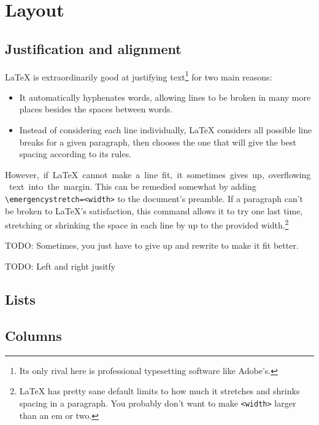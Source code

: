 \chapter{Layout}

\section{Justification and alignment}

\LaTeX{} is extraordinarily good at justifying text\footnote{Its
only rival here is professional typesetting software like Adobe's.}
for two main reasons:
\begin{itemize}
\item It automatically hyphenates words, allowing lines to be broken
    in many more places besides the spaces between
    words.\punckern{}

\item Instead of considering each line individually,
    \LaTeX{} considers all possible line breaks for a given paragraph,
    then chooses the one that will give the best spacing according to its
    rules.\punckern{}
\end{itemize}

\mbox{However, if \LaTeX{} cannot make a line fit, it sometimes gives up,
overflowing text into the margin.}
This can be remedied somewhat by adding
\verb|\emergencystretch=<width>| to the document's preamble.
If a paragraph can't be broken to \LaTeX's satisfaction,
this command allows it to try one last time,
stretching or shrinking the space in each line by up to the provided
width.\punckern\footnote{\LaTeX{} has pretty sane default limits to how much
it stretches and shrinks spacing in a paragraph.
You probably don't want to make \texttt{<width>} larger than an em or two.}

TODO: Sometimes, you just have to give up and rewrite to make it fit better.

TODO: Left and right jusitfy

\section{Lists}

\section{Columns}

